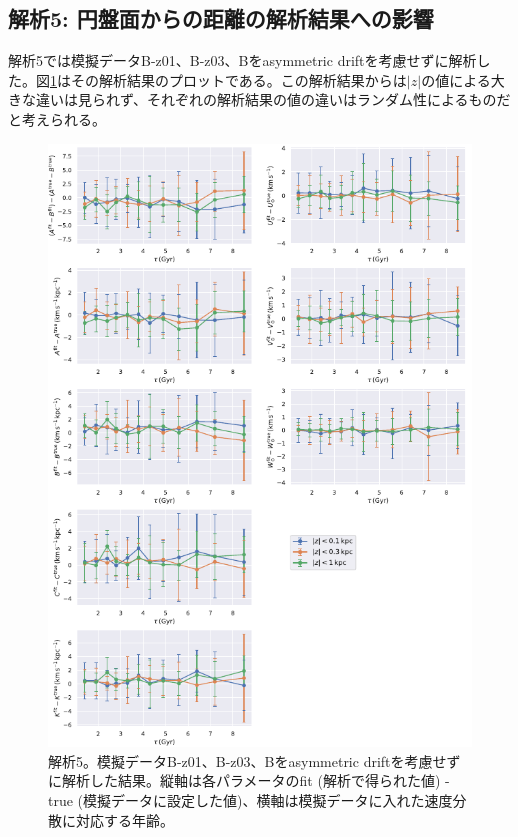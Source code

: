 
\subsection{解析5: 円盤面からの距離の解析結果への影響}
解析5では模擬データB-z01、B-z03、Bをasymmetric driftを考慮せずに解析した。図\ref{fig:Mock_z}はその解析結果のプロットである。この解析結果からは$|z|$の値による大きな違いは見られず、それぞれの解析結果の値の違いはランダム性によるものだと考えられる。

\begin{figure}[htbp]
	\centering
	\includegraphics[width=15cm]{fig/Mock_z.pdf}
	\caption{解析5。模擬データB-z01、B-z03、Bをasymmetric driftを考慮せずに解析した結果。縦軸は各パラメータのfit (解析で得られた値) - true (模擬データに設定した値)、横軸は模擬データに入れた速度分散に対応する年齢。} \label{fig:Mock_z}
\end{figure}

